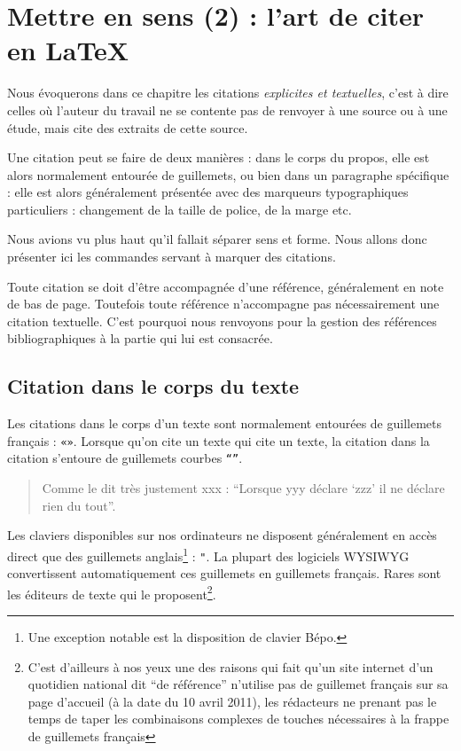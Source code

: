 \chapter{Mettre en sens (2) : l'art de citer en LaTeX}\label{citertexte}

\begin{prealable}
Nous évoquerons dans ce chapitre les citations \emph{explicites et textuelles}, c'est à dire celles où l'auteur du travail ne se contente pas de renvoyer à une source ou à une étude, mais cite des extraits de cette source.

Une citation peut se faire de deux manières : dans le corps du propos, elle est alors normalement entourée de guillemets, ou bien dans un paragraphe spécifique : elle est alors généralement présentée avec des marqueurs typographiques particuliers : changement de la taille de police, de la marge etc.

Nous avions vu plus haut qu'il fallait séparer sens et forme. Nous allons donc présenter ici les commandes servant à marquer des citations.

\end{prealable}
\begin{attention}
Toute citation se doit d'être accompagnée d'une référence, généralement en note de bas de page. Toutefois toute référence n'accompagne pas nécessairement une citation textuelle. C'est pourquoi nous renvoyons pour la gestion des références bibliographiques à la partie qui lui est consacrée.

\end{attention}

\section{Citation dans le corps du texte}\label{guillemets}

Les citations dans le corps d'un texte sont normalement entourées de guillemets français : \verb|«»|. Lorsque qu'on cite un texte qui cite un texte, la citation dans la citation s'entoure de guillemets courbes \verb|“”|. 

\begin{quotation}
    Comme le dit très justement xxx : \enquote{Lorsque yyy déclare \enquote{zzz} il ne déclare rien du tout}.
\end{quotation}

Les claviers disponibles sur nos ordinateurs ne disposent généralement en accès direct que des guillemets anglais\footnote{Une exception notable est la disposition de clavier Bépo.} : \verb|"|. 
La plupart des logiciels WYSIWYG convertissent automatiquement ces guillemets en guillemets français. Rares sont les éditeurs de texte qui le proposent\footnote{C'est d'ailleurs à nos yeux une des raisons qui fait qu'un site internet d'un quotidien national dit \enquote{de référence} n'utilise pas de guillemet français sur sa page d'accueil (à la date du 10 avril 2011), les rédacteurs ne prenant pas le temps de taper les combinaisons complexes de touches nécessaires à la frappe de guillemets français}. 

